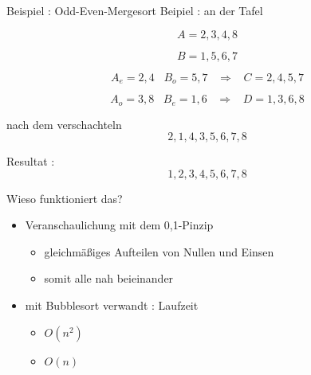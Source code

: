 \documentclass[ucs,9pt]{beamer}
\begin{document}
\begin{frame}{Beispiel : Odd-Even-Mergesort}
Beipiel : an der Tafel\\
\begin{itemize}
\item[] $$ A = 2,3,4,8 $$
\item[] $$ B = 1,5,6,7 $$
 {\item[] $$ A_e = 2,4 \;\;\; B_o = 5,7 \;\;\; \Rightarrow \;\;\; C= 2,4,5,7 $$}
 {\item[] $$ A_o = 3,8 \;\;\; B_e = 1,6 \;\;\; \Rightarrow \;\;\; D = 1,3,6,8 $$}
 {\item[] nach dem verschachteln $$ 2,1,4,3,5,6,7,8$$}
 {\item[] Resultat : $$1,2,3,4,5,6,7,8$$}
\end{itemize}
\end{frame}

\begin{frame}{Wieso funktioniert das?}
\begin{itemize}
\item Veranschaulichung mit dem 0,1-Pinzip
	\begin{itemize}
		\item gleichmäßiges Aufteilen von Nullen und Einsen
		\item somit alle nah beieinander
	\end{itemize}
\item mit Bubblesort verwandt : Laufzeit \\
\begin{itemize}
\item[worst : ] $O(n^2)$
\item[best  : ] $O(n)$
\end{itemize}

\end{itemize}
\end{frame}
\end{document}
